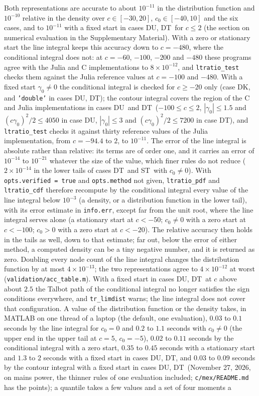 \documentclass[11pt]{article}
\newcommand{\code}[1]{\texttt{#1}}
\newcommand{\Fk}{\textsf{DK}}
\newcommand{\Fu}{\textsf{DU}}
\newcommand{\Ft}{\textsf{DT}}
\newcommand{\St}{\textsf{ST}}
\begin{document}
Both representations are accurate to about $10^{-11}$ in the distribution function and $10^{-10}$ relative in the density over $c\in[-30,20]$, $c_0\in[-40,10]$ and the six cases, and to $10^{-11}$ with a fixed start in cases \Fu, \Ft\ for $c\le2$ (the section on numerical evaluation in the Supplementary Material).  With a zero or stationary start the line integral keeps this accuracy down to $c=-480$, where the conditional integral does not: at $c=-60$, $-100$, $-200$ and $-480$ these programs agree with the Julia and C implementations to $8\times10^{-12}$, and \code{ltratio\_test} checks them against the Julia reference values at $c=-100$ and $-480$.  With a fixed start $\gamma_0\ne0$ the conditional integral is checked for $c\ge-20$ only (case \Fk, and \code{'double'} in cases \Fu, \Ft); the contour integral covers the region of the C and Julia implementations in cases \Fu\ and \Ft\ ($-100\le c\le2$, $|\gamma_0|\le1.5$ and $(c\gamma_0)^2/2\le4050$ in case \Fu, $|\gamma_0|\le3$ and $(c\gamma_0)^2/2\le7200$ in case \Ft), and \code{ltratio\_test} checks it against thirty reference values of the Julia implementation, from $c=-94.4$ to $2$, to $10^{-11}$.  The error of the line integral is absolute rather than relative: its terms are of order one, and it carries an error of $10^{-14}$ to $10^{-21}$ whatever the size of the value, which finer rules do not reduce ($2\times10^{-14}$ in the lower tails of cases \Ft\ and \St\ with $c_0\ne0$).  With \code{opts.verified = true} and \code{opts.method} not given, \code{ltratio\_pdf} and \code{ltratio\_cdf} therefore recompute by the conditional integral every value of the line integral below $10^{-3}$ (a density, or a distribution function in the lower tail), with its error estimate in \code{info.err}, except far from the unit root, where the line integral serves alone (a stationary start at $c<-50$; $c_0\ne0$ with a zero start at $c<-100$; $c_0>0$ with a zero start at $c<-20$).  The relative accuracy then holds in the tails as well, down to that estimate; far out, below the error of either method, a computed density can be a tiny negative number, and it is returned as zero.  Doubling every node count of the line integral changes the distribution function by at most $4\times10^{-13}$; the two representations agree to $4\times10^{-12}$ at worst (\code{validation/acc\_table.m}).  With a fixed start in cases \Fu, \Ft\ at $c$ above about $2.5$ the Talbot path of the conditional integral no longer satisfies the sign conditions everywhere, and \code{tr\_limdist} warns; the line integral does not cover that configuration.  A value of the distribution function or the density takes, in MATLAB on one thread of a laptop (the default, one evaluation), $0.03$ to $0.1$ seconds by the line integral for $c_0=0$ and $0.2$ to $1.1$ seconds with $c_0\ne0$ (the upper end in the upper tail at $c=5$, $c_0=-5$), $0.02$ to $0.11$ seconds by the conditional integral with a zero start, $0.35$ to $0.45$ seconds with a stationary start and $1.3$ to $2$ seconds with a fixed start in cases \Fu, \Ft, and $0.03$ to $0.09$ seconds by the contour integral with a fixed start in cases \Fu, \Ft\ (November 27, 2026, on mains power, the thinner rules of one evaluation included; \code{c/mex/README.md} has the points); a quantile takes a few values and a set of four moments a 
\end{document}
